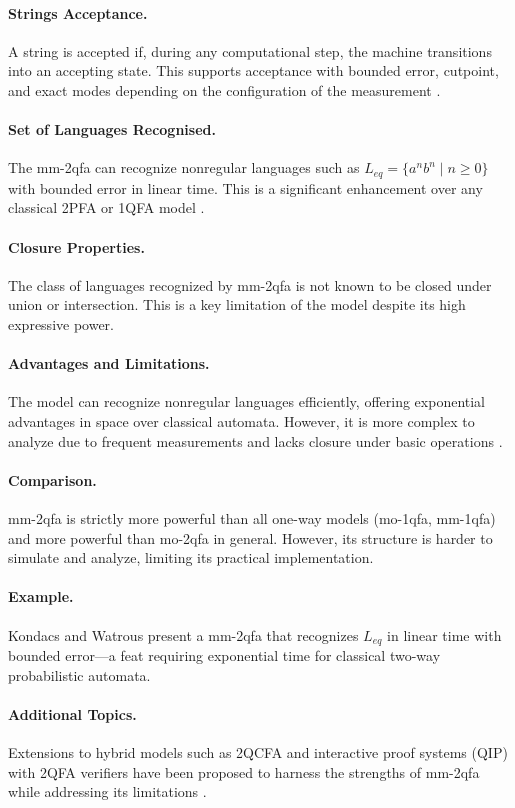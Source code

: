 \paragraph{Strings Acceptance.} A string is accepted if, during any computational step, the machine transitions into an accepting state. This supports acceptance with bounded error, cutpoint, and exact modes depending on the configuration of the measurement \cite{kondacs1997power}.

\paragraph{Set of Languages Recognised.} The \gls{mm-2qfa} can recognize nonregular languages such as $L_{eq} = \{ a^n b^n \mid n \geq 0 \}$ with bounded error in linear time. This is a significant enhancement over any classical 2PFA or 1QFA model \cite{kondacs1997power}.

\paragraph{Closure Properties.} The class of languages recognized by \gls{mm-2qfa} is not known to be closed under union or intersection. This is a key limitation of the model despite its high expressive power.

\paragraph{Advantages and Limitations.} The model can recognize nonregular languages efficiently, offering exponential advantages in space over classical automata. However, it is more complex to analyze due to frequent measurements and lacks closure under basic operations \cite{kondacs1997power, qiu2008state}.

\paragraph{Comparison.} \gls{mm-2qfa} is strictly more powerful than all one-way models (\gls{mo-1qfa}, \gls{mm-1qfa}) and more powerful than \gls{mo-2qfa} in general. However, its structure is harder to simulate and analyze, limiting its practical implementation.

\paragraph{Example.} Kondacs and Watrous \cite{kondacs1997power} present a \gls{mm-2qfa} that recognizes $L_{eq}$ in linear time with bounded error—a feat requiring exponential time for classical two-way probabilistic automata.

\paragraph{Additional Topics.} Extensions to hybrid models such as 2QCFA and interactive proof systems (QIP) with 2QFA verifiers have been proposed to harness the strengths of \gls{mm-2qfa} while addressing its limitations \cite{pani2011empowering, qiu2008state}.

